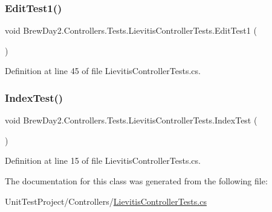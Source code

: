 \subsubsection{\texorpdfstring{Edit\+Test1()}{EditTest1()}}
{\footnotesize\ttfamily void Brew\+Day2.\+Controllers.\+Tests.\+Lievitis\+Controller\+Tests.\+Edit\+Test1 (\begin{DoxyParamCaption}{ }\end{DoxyParamCaption})}



Definition at line 45 of file Lievitis\+Controller\+Tests.\+cs.

\mbox{\label{class_brew_day2_1_1_controllers_1_1_tests_1_1_lievitis_controller_tests_ad5a7004521c5ab9d46077846eec18c29}} 
\subsubsection{\texorpdfstring{Index\+Test()}{IndexTest()}}
{\footnotesize\ttfamily void Brew\+Day2.\+Controllers.\+Tests.\+Lievitis\+Controller\+Tests.\+Index\+Test (\begin{DoxyParamCaption}{ }\end{DoxyParamCaption})}



Definition at line 15 of file Lievitis\+Controller\+Tests.\+cs.



The documentation for this class was generated from the following file\+:\begin{DoxyCompactItemize}
\item 
Unit\+Test\+Project/\+Controllers/\mbox{\hyperlink{_lievitis_controller_tests_8cs}{Lievitis\+Controller\+Tests.\+cs}}\end{DoxyCompactItemize}
